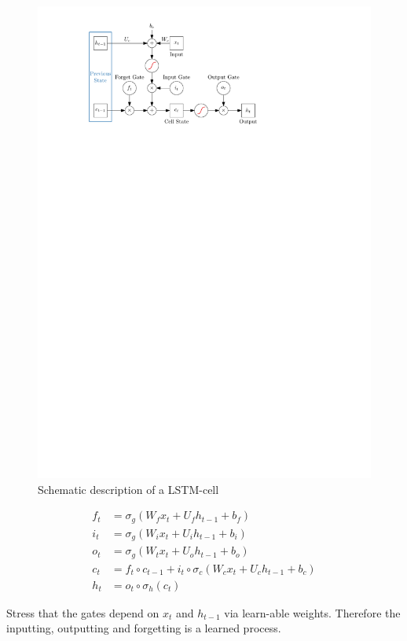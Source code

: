 \begin{figure}[t]
  \centering
  \includegraphics{./figures/theory/LSTM.pdf}
  \caption{Schematic description of a LSTM-cell}
  \label{fig:schematic_lstm}
\end{figure}

\cite{lstm}
\begin{align*}
  f_t &= \sigma_g( W_f x_t + U_f h_{t-1} + b_f) \\
  i_t &= \sigma_g( W_i x_t + U_i h_{t-1} + b_i) \\
  o_t &= \sigma_g( W_t x_t + U_o h_{t-1} + b_o) \\
  c_t &= f_t \circ c_{t-1} + i_t \circ \sigma_c(W_c x_t + U_c h_{t-1} + b_c) \\
  h_t &= o_t \circ \sigma_h(c_t)
\end{align*}

Stress that the gates depend on $x_t$ and $h_{t-1}$ via learn-able weights.
Therefore the inputting, outputting and forgetting is a learned process.

